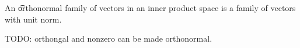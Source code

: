 


An \t{orthonormal family of vectors} in an inner product space is a family of vectors with unit norm.

\begin{prop}
  TODO: orthongal and nonzero can be made orthonormal.
\end{prop}
